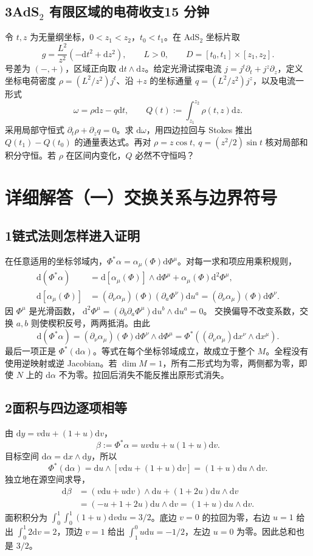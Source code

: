 \documentclass[11pt,a4paper]{article}
\newcommand{\D}{\mathrm d}
\newcommand{\head}[1]{\section*{\color{teal}#1}}
\begin{document}
\subsection*{3\quad AdS$_2$ 有限区域的电荷收支\hfill 15 分钟}
令 $t,z$ 为无量纲坐标，$0<z_1<z_2$，$t_0<t_1$。在 AdS$_2$ 坐标片取
\[
 g=\frac{L^2}{z^2}(-\D t^2+\D z^2),\qquad L>0,
 \qquad D=[t_0,t_1]\times[z_1,z_2].
\]
号差为 $(-,+)$，区域正向取 $\D t\wedge\D z$。给定光滑试探电流
$j=j^t\partial_t+j^z\partial_z$，定义坐标电荷密度 $\rho=(L^2/z^2)j^t$、沿 $+z$ 的坐标通量 $q=(L^2/z^2)j^z$，以及电流一形式
\[
 \omega=\rho\D z-q\D t,\qquad Q(t):=\int_{z_1}^{z_2}\rho(t,z)\D z .
\]
采用局部守恒式 $\partial_t\rho+\partial_zq=0$。求 $\D\omega$，用四边拉回与 Stokes 推出 $Q(t_1)-Q(t_0)$ 的通量表达式。再对 $\rho=z\cos t,\ q=(z^2/2)\sin t$ 核对局部和积分守恒。若 $\rho$ 在区间内变化，$Q$ 必然不守恒吗？
\newpage
\head{详细解答（一）\quad 交换关系与边界符号}
\subsection*{1\quad 链式法则怎样进入证明}
在任意适用的坐标邻域内，$\Phi^*\alpha=\alpha_\mu(\Phi)\D\Phi^\mu$。对每一求和项应用乘积规则，
\[
\begin{aligned}
 \D(\Phi^*\alpha)
 &=\D[\alpha_\mu(\Phi)]\wedge\D\Phi^\mu
   +\alpha_\mu(\Phi)\D^2\Phi^\mu,\\
 \D[\alpha_\mu(\Phi)]
 &=(\partial_\nu\alpha_\mu)(\Phi)
       (\partial_a\Phi^\nu)\D u^a
  =(\partial_\nu\alpha_\mu)(\Phi)\D\Phi^\nu .
\end{aligned}
\]
因 $\Phi^\mu$ 是光滑函数，
$\D^2\Phi^\mu=(\partial_b\partial_a\Phi^\mu)\D u^b\wedge\D u^a=0$。
交换偏导不改变系数，交换 $a,b$ 则使楔积反号，两两抵消。由此
\[
 \D(\Phi^*\alpha)
 = (\partial_\nu\alpha_\mu)(\Phi)\D\Phi^\nu\wedge\D\Phi^\mu
 =\Phi^*((\partial_\nu\alpha_\mu)\D x^\nu\wedge\D x^\mu).
\]
最后一项正是 $\Phi^*(\D\alpha)$。等式在每个坐标邻域成立，故成立于整个 $M$。全程没有使用逆映射或逆 Jacobian。若 $\dim M=1$，所有二形式均为零，两侧都为零，即使 $N$ 上的 $\D\alpha$ 不为零。拉回后消失不能反推出原形式消失。

\subsection*{2\quad 面积与四边逐项相等}
由 $\D y=v\D u+(1+u)\D v$，
\[
 \beta:=\Phi^*\alpha=uv\D u+u(1+u)\D v .
\]
目标空间 $\D\alpha=\D x\wedge\D y$，所以
\[
 \Phi^*(\D\alpha)=\D u\wedge[v\D u+(1+u)\D v]
 =(1+u)\D u\wedge\D v .
\]
独立地在源空间求导，
\[
\begin{aligned}
 \D\beta
 &=(v\D u+u\D v)\wedge\D u+(1+2u)\D u\wedge\D v\\
 &=(-u+1+2u)\D u\wedge\D v=(1+u)\D u\wedge\D v .
\end{aligned}
\]
面积积分为 $\int_0^1\int_0^1(1+u)\D v\D u=3/2$。底边 $v=0$ 的拉回为零，右边 $u=1$ 给出 $\int_0^1 2\D v=2$，顶边 $v=1$ 给出 $\int_1^0u\D u=-1/2$，左边 $u=0$ 为零。因此总和也是 $3/2$。
\end{document}
